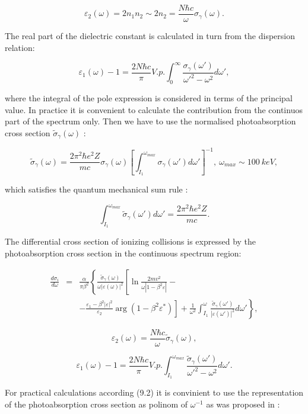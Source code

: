 \[
\varepsilon_2(\omega) = 2n_1n_2 \sim 2n_2 = \frac{N\hbar c}{\omega}
\sigma_{\gamma}(\omega) .
\]

The real part of the dielectric constant is calculated in turn from the dispersion
relation:

\[
\varepsilon_1(\omega) - 1 = \frac{2N\hbar c}{\pi}V.p.\int_{0}^{\infty}
\frac{\sigma_{\gamma}(\omega')}{\omega'^2 - \omega^2}d\omega'  ,
\]

where the integral of the pole expression is considered in terms of the
principal value. In practice it is convenient to calculate the contribution from 
the continuos part of the spectrum only. Then we have to use the normalised
photoabsorption cross section $\tilde{\sigma}_{\gamma}(\omega)$ :

\[
\tilde{\sigma}_{\gamma}(\omega) = \frac{2\pi^2\hbar e^2Z}{mc}
\sigma_{\gamma}(\omega)
\left[
\int_{I_1}^{\omega_{max}}\sigma_{\gamma}(\omega')d\omega'
\right]^{-1}, \  \omega_{max} \sim 100 \ keV ,
\]

which satisfies the quantum mechanical sum rule \cite{fano}:

\[
\int_{I_1}^{\omega_{max}}\tilde{\sigma}_{\gamma}(\omega')d\omega' = 
\frac{2\pi^2\hbar e^2Z}{mc} .
\]

The differential cross section of ionizing collisions is expressed by the 
photoabsorption cross section in the continuous spectrum region:

\begin{eqnarray}
\frac{d\sigma_i}{d\omega}
& = & \frac{\alpha}{\pi\beta^2}
\left\{
\frac{\tilde{\sigma}_{\gamma}(\omega)}
{\omega\left|\varepsilon(\omega)\right|^2}
\left[
\ln\frac{2mv^2}{\omega\left|1-\beta^2\varepsilon\right|} - 
\right. \right.   \nonumber \\
&   & \left. \left.
- \frac{\varepsilon_1-\beta^2\left|\varepsilon\right|^2}{\varepsilon_2}
\arg(1-\beta^2\varepsilon^*)
\right] 
 + \frac{1}{\omega^2}\int_{I_1}^{\omega}\frac{\tilde{\sigma}_{\gamma}(\omega')}
{\left|\varepsilon(\omega')\right|^2}d\omega'
\right\} ,
\end{eqnarray}

\[
\varepsilon_2(\omega) = \frac{N\hbar c}{\omega}
\tilde{\sigma}_{\gamma}(\omega) ,
\]

\[
\varepsilon_1(\omega) - 1 = \frac{2N\hbar c}{\pi}V.p.\int_{I_1}^{\omega_{max}}
\frac{\tilde{\sigma}_{\gamma}(\omega')}{\omega'^2 - \omega^2}d\omega'  .
\]

For practical calculations according (9.2) it is convinient to use the 
representation of the photoabsorption cross section as polinom of $\omega^{-1}$ as
was proposed in \cite{sandia}:

